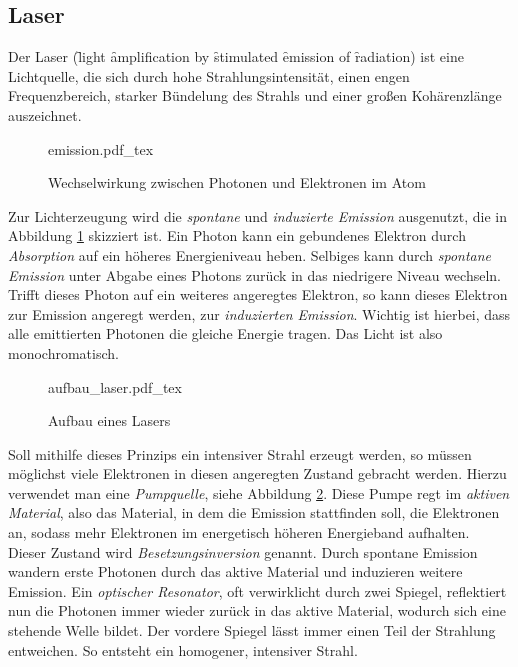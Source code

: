 \clearpage

    \subsection{Laser}

Der Laser (\f light \f amplification by \f stimulated \f emission of \f radiation)
ist eine Lichtquelle, die sich durch hohe Strahlungsintensität, einen engen 
Frequenzbereich, starker Bündelung des Strahls und einer großen Kohärenzlänge 
auszeichnet. \par
\begin{figure}[h]
  \centering
  {emission.pdf_tex}
  \caption{Wechselwirkung zwischen Photonen und Elektronen im Atom}
  \label{abb:emission}
\end{figure}
Zur Lichterzeugung wird die \emph{spontane} und \emph{induzierte Emission} 
ausgenutzt, die in Abbildung \ref{abb:emission} skizziert ist. Ein Photon kann
ein gebundenes Elektron durch \emph{Absorption} auf ein höheres Energieniveau 
heben. Selbiges kann durch \emph{spontane Emission} unter Abgabe eines Photons
zurück in das niedrigere Niveau wechseln. Trifft dieses Photon auf ein weiteres
angeregtes Elektron, so kann dieses Elektron zur Emission angeregt werden, zur
\emph{induzierten Emission}. Wichtig ist hierbei, dass alle emittierten Photonen
die gleiche Energie tragen. Das Licht ist also monochromatisch. \par
\begin{figure}
  \centering
  {aufbau_laser.pdf_tex}
  \caption{Aufbau eines Lasers}
  \label{abb:aufbau_laser}
\end{figure}
Soll mithilfe dieses Prinzips ein intensiver Strahl erzeugt werden, so müssen 
möglichst viele Elektronen in diesen angeregten Zustand gebracht werden. Hierzu
verwendet man eine \emph{Pumpquelle}, siehe Abbildung \ref{abb:aufbau_laser}.
Diese Pumpe regt im \emph{aktiven Material},
also das Material, in dem die Emission stattfinden soll, die Elektronen an, sodass
mehr Elektronen im energetisch höheren Energieband aufhalten. Dieser Zustand wird
\emph{Besetzungsinversion} genannt. Durch spontane Emission wandern erste Photonen
durch das aktive Material und induzieren weitere Emission. 
Ein \emph{optischer Resonator}, oft verwirklicht durch zwei Spiegel, reflektiert nun
die Photonen immer wieder zurück in das aktive Material, wodurch sich eine stehende
Welle bildet. Der vordere Spiegel lässt immer einen Teil der Strahlung entweichen.
So entsteht ein homogener, intensiver Strahl. \par
